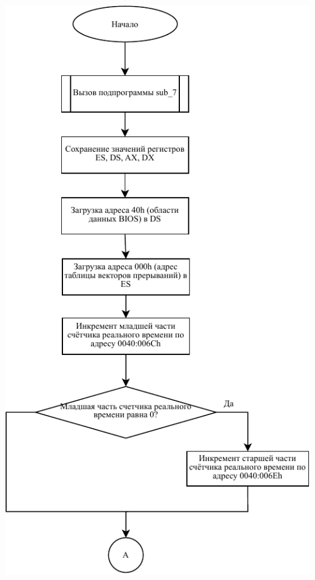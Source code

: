 \documentclass[a4paper,12pt]{article}
\begin{document}
\begin{center}
    \includegraphics[height=0.9\textheight]{flowchart/1.pdf}
    \newpage

\end{center}
\end{document}
